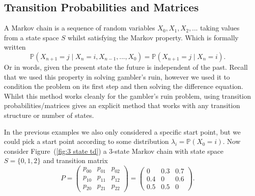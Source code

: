 \documentclass[11pt,a4paper]{article}
\begin{document}
\subsection{Transition Probabilities and Matrices}
A Markov chain is a sequence of random variables $X_0, X_1,X_2,...$ taking values from a state space $S$ whilst satisfying the Markov property. Which is formally written \[\mathbb{P}(X_{n+1}=j \mid X_n=i,X_{n-1},...,X_0)=\mathbb{P}(X_{n+1}=j \mid X_n=i).\]
Or in words, given the present state the future is independent of the past. Recall that we used this property in solving gambler's ruin, however we used it to condition the problem on its first step and then solving the difference equation. Whilst this method works cleanly for the gambler's ruin problem, using transition probabilities/matrices gives an explicit method that works with any transition structure or number of states.

In the previous examples we also only considered a specific start point, but we could pick a start point according to some distribution $\lambda_i =\mathbb{P}(X_0=i)$. Now consider Figure~(\ref{fig:3 state td}) a 3-state Markov chain with state space $S=\{0,1,2\}$ and transition matrix \[P = \begin{pmatrix}
    p_{00}&p_{01}&p_{02}\\
    p_{10}&p_{11}&p_{12}\\
    p_{20}&p_{21}&p_{22}
\end{pmatrix}=\begin{pmatrix}
    0&0.3&0.7\\
    0.4&0&0.6\\
    0.5&0.5&0
\end{pmatrix}.\]
\end{document}
